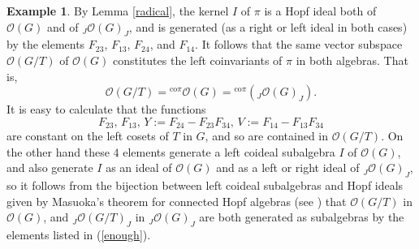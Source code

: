 \documentclass{amsart}
\numberwithin{equation}{section}
\theoremstyle{definition}
\newtheorem{example}[theorem]{Example}
\begin{document}
\begin{example}
 By Lemma \ref{radical}, the kernel $I$ of $\pi$ is a Hopf ideal  both of $\mathcal{O}(G)$ and of $_J\mathcal{O}(G)_J$, and is generated (as a right or left ideal in both cases) by the elements $F_{23}$, $F_{13}$, $F_{24}$, and  $F_{14}$. It follows that the  same vector subspace $\mathcal{O}(G/T)$ of $\mathcal{O}(G)$ constitutes the left coinvariants of $\pi$ in both algebras. That is,
 $$\mathcal{O}(G/T) = {}^{\mathrm{co} \pi}\mathcal{O}(G)= {}^{\mathrm{co} \pi}({}_J\mathcal{O}(G)_J).$$
It is easy to calculate that the functions
\begin{equation}\label{enough} 
F_{23},\, F_{13}, \,Y := F_{24} - F_{23}F_{34}, \, V := F_{14} - F_{13}F_{34}
\end{equation}
are constant on the left cosets of $T$ in $G$, and so are contained in $\mathcal{O}(G/T)$. On the other hand these $4$ elements generate a left coideal subalgebra $I$ of $\mathcal{O}(G)$, and also generate $I$ as an ideal of $\mathcal{O}(G)$ and as a left or right ideal of ${}_J\mathcal{O}(G)_J$, so it follows from the bijection between left coideal subalgebras and Hopf ideals given by Masuoka's theorem for connected Hopf algebras (see \cite[Proposition 2.3, Theorem 3.2]{BG}) that $\mathcal{O}(G/T)$ in $\mathcal{O}(G)$, and ${}_J\mathcal{O}(G/T)_J$ in ${}_J\mathcal{O}(G)_J$ are both generated as subalgebras by the elements listed in (\ref{enough}).


\end{example}
\end{document}
